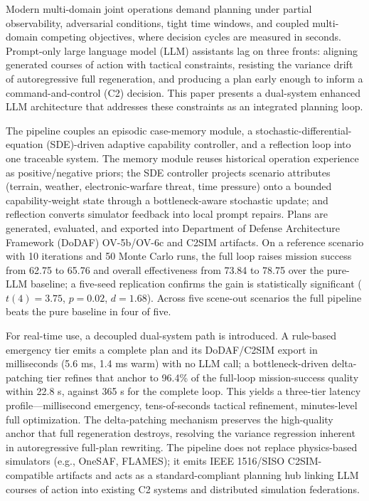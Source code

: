 Modern multi-domain joint operations demand planning under partial observability, adversarial conditions, tight time windows, and coupled multi-domain competing objectives, where decision cycles are measured in seconds. Prompt-only large language model (LLM) assistants lag on three fronts: aligning generated courses of action with tactical constraints, resisting the variance drift of autoregressive full regeneration, and producing a plan early enough to inform a command-and-control (C2) decision. This paper presents a dual-system enhanced LLM architecture that addresses these constraints as an integrated planning loop.

The pipeline couples an episodic case-memory module, a stochastic-differential-equation (SDE)-driven adaptive capability controller, and a reflection loop into one traceable system. The memory module reuses historical operation experience as positive/negative priors; the SDE controller projects scenario attributes (terrain, weather, electronic-warfare threat, time pressure) onto a bounded capability-weight state through a bottleneck-aware stochastic update; and reflection converts simulator feedback into local prompt repairs. Plans are generated, evaluated, and exported into Department of Defense Architecture Framework (DoDAF) OV-5b/OV-6c and C2SIM artifacts. On a reference scenario with 10 iterations and 50 Monte Carlo runs, the full loop raises mission success from 62.75 to 65.76 and overall effectiveness from 73.84 to 78.75 over the pure-LLM baseline; a five-seed replication confirms the gain is statistically significant ($t(4)=3.75$, $p=0.02$, $d=1.68$). Across five scene-out scenarios the full pipeline beats the pure baseline in four of five.

For real-time use, a decoupled dual-system path is introduced. A rule-based emergency tier emits a complete plan and its DoDAF/C2SIM export in milliseconds (5.6 ms, 1.4 ms warm) with no LLM call; a bottleneck-driven delta-patching tier refines that anchor to 96.4\% of the full-loop mission-success quality within 22.8 s, against 365 s for the complete loop. This yields a three-tier latency profile---millisecond emergency, tens-of-seconds tactical refinement, minutes-level full optimization. The delta-patching mechanism preserves the high-quality anchor that full regeneration destroys, resolving the variance regression inherent in autoregressive full-plan rewriting. The pipeline does not replace physics-based simulators (e.g., OneSAF, FLAMES); it emits IEEE 1516/SISO C2SIM-compatible artifacts and acts as a standard-compliant planning hub linking LLM courses of action into existing C2 systems and distributed simulation federations.
